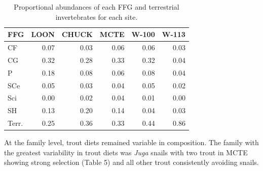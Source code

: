 \documentclass[double,12pt]{beavtex}
\begin{document}
  \begin{table}[t]
  
  \caption{\label{tab:dietffg}Proportional abundances of each FFG and terrestrial invertebrates for each site.}
  \centering
  \begin{tabular}{lrrrrr}
  \toprule
  FFG & LOON & CHUCK & MCTE & W-100 & W-113\\
  \midrule
  CF & 0.07 & 0.03 & 0.06 & 0.06 & 0.03\\
  CG & 0.32 & 0.28 & 0.33 & 0.32 & 0.04\\
  P & 0.18 & 0.08 & 0.06 & 0.08 & 0.04\\
  SCe & 0.05 & 0.03 & 0.04 & 0.05 & 0.02\\
  Sci & 0.00 & 0.02 & 0.04 & 0.01 & 0.00\\
  \addlinespace
  SH & 0.13 & 0.20 & 0.14 & 0.04 & 0.03\\
  Terr. & 0.25 & 0.36 & 0.33 & 0.44 & 0.86\\
  \bottomrule
  \end{tabular}
  \end{table}
  
  At the family level, trout diets remained variable in composition. The
  family with the greatest variability in trout diets was \emph{Juga}
  snails with two trout in MCTE showing strong selection (Table 5) and all
  other trout consistently avoiding snails.
  
\end{document}
